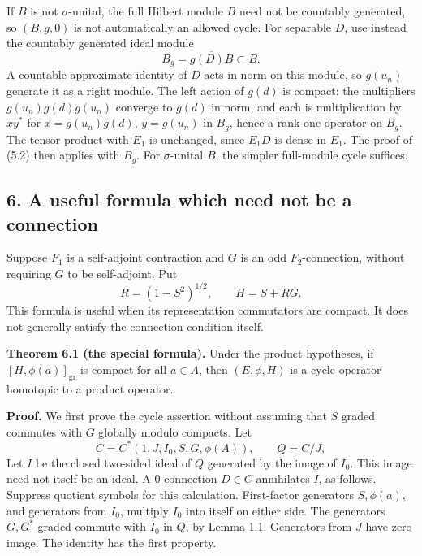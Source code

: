 \documentclass[
  11pt,
]{article}
\begin{document}
If \(B\) is not \(\sigma\)-unital, the full Hilbert module \(B\) need
not be countably generated, so \((B,g,0)\) is not automatically an
allowed cycle. For separable \(D\), use instead the countably generated
ideal module \[
B_g=\overline{g(D)B}\subset B.
\] A countable approximate identity of \(D\) acts in norm on this
module, so \(g(u_n)\) generate it as a right module. The left action of
\(g(d)\) is compact: the multipliers \(g(u_n)g(d)g(u_n)\) converge to
\(g(d)\) in norm, and each is multiplication by \(xy^*\) for
\(x=g(u_n)g(d)\), \(y=g(u_n)\) in \(B_g\), hence a rank-one operator on
\(B_g\). The tensor product with \(E_1\) is unchanged, since \(E_1D\) is
dense in \(E_1\). The proof of (5.2) then applies with \(B_g\). For
\(\sigma\)-unital \(B\), the simpler full-module cycle suffices.

\subsection{6. A useful formula which need not be a
connection}\label{a-useful-formula-which-need-not-be-a-connection}

Suppose \(F_1\) is a self-adjoint contraction and \(G\) is an odd
\(F_2\)-connection, without requiring \(G\) to be self-adjoint. Put \[
R=(1-S^2)^{1/2},\qquad H=S+RG.
\tag{6.1}
\] This formula is useful when its representation commutators are
compact. It does not generally satisfy the connection condition itself.

\textbf{Theorem 6.1 (the special formula).} Under the product
hypotheses, if \([H,\phi(a)]_{\mathrm{gr}}\) is compact for all
\(a\in A\), then \((E,\phi,H)\) is a cycle operator homotopic to a
product operator.

\textbf{Proof.} We first prove the cycle assertion without assuming that
\(S\) graded commutes with \(G\) globally modulo compacts. Let \[
C=C^*(1,J,I_0,S,G,\phi(A)),\qquad Q=C/J,
\] Let \(I\) be the closed two-sided ideal of \(Q\) generated by the
image of \(I_0\). This image need not itself be an ideal. A
\(0\)-connection \(D\in C\) annihilates \(I\), as follows. Suppress
quotient symbols for this calculation. First-factor generators
\(S,\phi(a)\), and generators from \(I_0\), multiply \(I_0\) into itself
on either side. The generators \(G,G^*\) graded commute with \(I_0\) in
\(Q\), by Lemma 1.1. Generators from \(J\) have zero image. The identity
has the first property.
\end{document}
